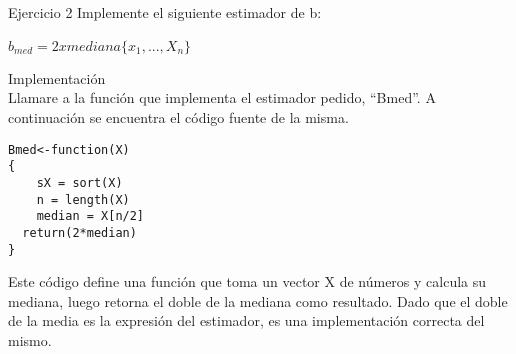
\begin{section}{Ejercicio 2}
Implemente el siguiente estimador de b:

$\hat{b}_{med} = 2xmediana\{x_1, ... ,X_n	\}$



\begin{subsection}{Implementación}~\\

Llamare a la función que implementa el estimador pedido, ``Bmed''. A continuación se encuentra el código fuente de la misma.
\begin{verbatim}
Bmed<-function(X)
{
	sX = sort(X)
	n = length(X)
    median = X[n/2]
  return(2*median)
}
\end{verbatim}

Este código define una función que toma un vector X de números y calcula su mediana, luego retorna el doble de la mediana como resultado. Dado que el doble de la media es la expresión del estimador, es una implementación correcta del mismo.


\end{subsection}
\end{section}

